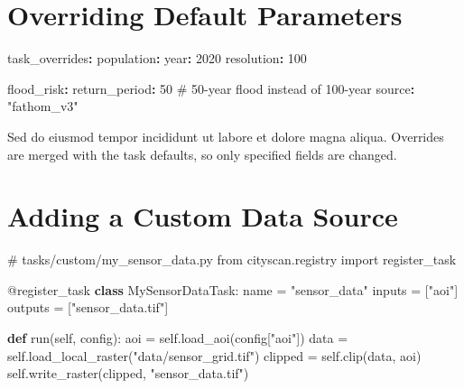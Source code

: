 \documentclass[
  letterpaper,
  DIV=11,
  numbers=noendperiod]{scrreprt}
\newenvironment{Shaded}{\begin{snugshade}}{\end{snugshade}}
\newcommand{\AttributeTok}[1]{\textcolor[rgb]{0.40,0.45,0.13}{#1}}
\newcommand{\CommentTok}[1]{\textcolor[rgb]{0.37,0.37,0.37}{#1}}
\newcommand{\DecValTok}[1]{\textcolor[rgb]{0.68,0.00,0.00}{#1}}
\newcommand{\FunctionTok}[1]{\textcolor[rgb]{0.28,0.35,0.67}{#1}}
\newcommand{\ImportTok}[1]{\textcolor[rgb]{0.00,0.46,0.62}{#1}}
\newcommand{\KeywordTok}[1]{\textcolor[rgb]{0.00,0.23,0.31}{\textbf{#1}}}
\newcommand{\NormalTok}[1]{\textcolor[rgb]{0.00,0.23,0.31}{#1}}
\newcommand{\OperatorTok}[1]{\textcolor[rgb]{0.37,0.37,0.37}{#1}}
\newcommand{\StringTok}[1]{\textcolor[rgb]{0.13,0.47,0.30}{#1}}
\newcommand{\VariableTok}[1]{\textcolor[rgb]{0.07,0.07,0.07}{#1}}
\begin{document}
\section{Overriding Default
Parameters}\label{overriding-default-parameters}

\begin{Shaded}
\begin{Highlighting}[]
\FunctionTok{task\_overrides}\KeywordTok{:}
\AttributeTok{  }\FunctionTok{population}\KeywordTok{:}
\AttributeTok{    }\FunctionTok{year}\KeywordTok{:}\AttributeTok{ }\DecValTok{2020}
\AttributeTok{    }\FunctionTok{resolution}\KeywordTok{:}\AttributeTok{ }\DecValTok{100}

\AttributeTok{  }\FunctionTok{flood\_risk}\KeywordTok{:}
\AttributeTok{    }\FunctionTok{return\_period}\KeywordTok{:}\AttributeTok{ }\DecValTok{50}\CommentTok{   \# 50{-}year flood instead of 100{-}year}
\AttributeTok{    }\FunctionTok{source}\KeywordTok{:}\AttributeTok{ }\StringTok{"fathom\_v3"}
\end{Highlighting}
\end{Shaded}

Sed do eiusmod tempor incididunt ut labore et dolore magna aliqua.
Overrides are merged with the task defaults, so only specified fields
are changed.

\section{Adding a Custom Data Source}\label{adding-a-custom-data-source}

\begin{Shaded}
\begin{Highlighting}[]
\CommentTok{\# tasks/custom/my\_sensor\_data.py}
\ImportTok{from}\NormalTok{ cityscan.registry }\ImportTok{import}\NormalTok{ register\_task}

\AttributeTok{@register\_task}
\KeywordTok{class}\NormalTok{ MySensorDataTask:}
\NormalTok{    name }\OperatorTok{=} \StringTok{"sensor\_data"}
\NormalTok{    inputs }\OperatorTok{=}\NormalTok{ [}\StringTok{"aoi"}\NormalTok{]}
\NormalTok{    outputs }\OperatorTok{=}\NormalTok{ [}\StringTok{"sensor\_data.tif"}\NormalTok{]}

    \KeywordTok{def}\NormalTok{ run(}\VariableTok{self}\NormalTok{, config):}
\NormalTok{        aoi }\OperatorTok{=} \VariableTok{self}\NormalTok{.load\_aoi(config[}\StringTok{"aoi"}\NormalTok{])}
\NormalTok{        data }\OperatorTok{=} \VariableTok{self}\NormalTok{.load\_local\_raster(}\StringTok{"data/sensor\_grid.tif"}\NormalTok{)}
\NormalTok{        clipped }\OperatorTok{=} \VariableTok{self}\NormalTok{.clip(data, aoi)}
        \VariableTok{self}\NormalTok{.write\_raster(clipped, }\StringTok{"sensor\_data.tif"}\NormalTok{)}
\end{Highlighting}
\end{Shaded}
\end{document}
